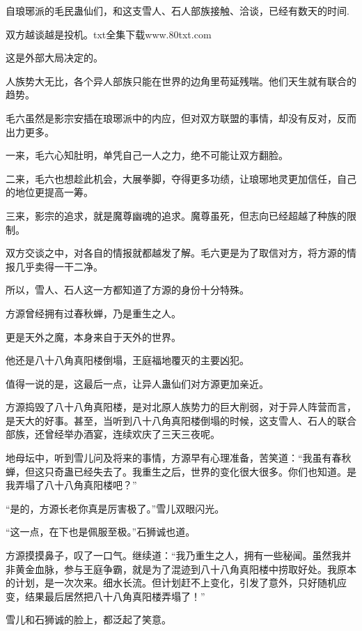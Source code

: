 
\begin{this_body}

自琅琊派的毛民蛊仙们，和这支雪人、石人部族接触、洽谈，已经有数天的时间.

双方越谈越是投机。txt全集下载www.80txt.com

这是外部大局决定的。

人族势大无比，各个异人部族只能在世界的边角里苟延残喘。他们天生就有联合的趋势。

毛六虽然是影宗安插在琅琊派中的内应，但对双方联盟的事情，却没有反对，反而出力更多。

一来，毛六心知肚明，单凭自己一人之力，绝不可能让双方翻脸。

二来，毛六也想趁此机会，大展拳脚，夺得更多功绩，让琅琊地灵更加信任，自己的地位更提高一筹。

三来，影宗的追求，就是魔尊幽魂的追求。魔尊虽死，但志向已经超越了种族的限制。

双方交谈之中，对各自的情报就都越发了解。毛六更是为了取信对方，将方源的情报几乎卖得一干二净。

所以，雪人、石人这一方都知道了方源的身份十分特殊。

方源曾经拥有过春秋蝉，乃是重生之人。

更是天外之魔，本身来自于天外的世界。

他还是八十八角真阳楼倒塌，王庭福地覆灭的主要凶犯。

值得一说的是，这最后一点，让异人蛊仙们对方源更加亲近。

方源捣毁了八十八角真阳楼，是对北原人族势力的巨大削弱，对于异人阵营而言，是天大的好事。甚至，当听到八十八角真阳楼倒塌的时候，这支雪人、石人的联合部族，还曾经举办酒宴，连续欢庆了三天三夜呢。

地母坛中，听到雪儿问及将来的事情，方源早有心理准备，苦笑道：“我虽有春秋蝉，但这只奇蛊已经失去了。我重生之后，世界的变化很大很多。你们也知道。是我弄塌了八十八角真阳楼吧？”

“是的，方源长老你真是厉害极了。”雪儿双眼闪光。

“这一点，在下也是佩服至极。”石狮诚也道。

方源摸摸鼻子，叹了一口气。继续道：“我乃重生之人，拥有一些秘闻。虽然我并非黄金血脉，参与王庭争霸，就是为了混迹到八十八角真阳楼中捞取好处。我原本的计划，是一次次来。细水长流。但计划赶不上变化，引发了意外，只好随机应变，结果最后居然把八十八角真阳楼弄塌了！”

雪儿和石狮诚的脸上，都泛起了笑意。


\end{this_body}
